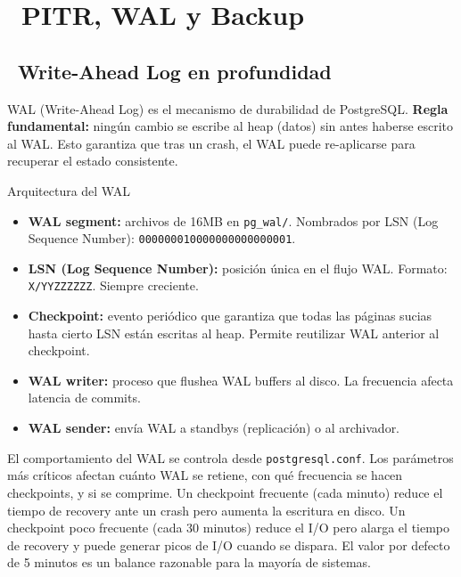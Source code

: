 \chapter[PITR, WAL y Backup]{~PITR, WAL y Backup}

\section[Write-Ahead Log en profundidad]{~Write-Ahead Log en profundidad}

WAL (Write-Ahead Log) es el mecanismo de durabilidad de PostgreSQL.
\textbf{Regla fundamental:} ningún cambio se escribe al heap (datos) sin antes haberse escrito al WAL.
Esto garantiza que tras un crash, el WAL puede re-aplicarse para recuperar el estado consistente.

\begin{teoriabox}{Arquitectura del WAL}
\begin{itemize}
  \item \textbf{WAL segment:} archivos de 16MB en \texttt{pg\_wal/}. Nombrados por LSN (Log Sequence Number): \texttt{000000010000000000000001}.
  \item \textbf{LSN (Log Sequence Number):} posición única en el flujo WAL. Formato: \texttt{X/YYZZZZZZ}. Siempre creciente.
  \item \textbf{Checkpoint:} evento periódico que garantiza que todas las páginas sucias hasta cierto LSN están escritas al heap. Permite reutilizar WAL anterior al checkpoint.
  \item \textbf{WAL writer:} proceso que flushea WAL buffers al disco. La frecuencia afecta latencia de commits.
  \item \textbf{WAL sender:} envía WAL a standbys (replicación) o al archivador.
\end{itemize}
\end{teoriabox}

El comportamiento del WAL se controla desde \texttt{postgresql.conf}.
Los parámetros más críticos afectan cuánto WAL se retiene, con qué frecuencia se hacen checkpoints, y si se comprime.
Un checkpoint frecuente (cada minuto) reduce el tiempo de recovery ante un crash pero aumenta la escritura en disco.
Un checkpoint poco frecuente (cada 30 minutos) reduce el I/O pero alarga el tiempo de recovery y puede generar picos de I/O cuando se dispara.
El valor por defecto de 5 minutos es un balance razonable para la mayoría de sistemas.

